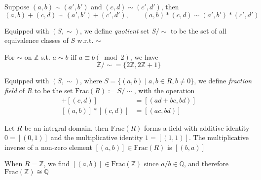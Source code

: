 \begin{proposition}
Suppose $(a,b)\sim(a',b')$ and $(c,d)\sim(c',d')$, then
\[
(a,b)+(c,d)\sim(a',b')+(c',d'),\qquad
(a,b)*(c,d)\sim(a',b')*(c',d')
\]
\end{proposition}
\begin{definition}
Equipped with $(S,\sim)$, we define \emph{quotient} set $S/\sim$ to be the set of all equivalence classes of $S$ w.r.t. $\sim$
\end{definition}


\begin{example}
For $\sim$ on $\mathbb{Z}$ s.t. $a\sim b$ iff $a\equiv b(\bmod 2)$, we have
\[
\mathbb{Z}/\sim  = \{2\mathbb{Z},2\mathbb{Z}+1\}
\]
\end{example}
\begin{definition}
Equipped with $(S,\sim)$, where $S=\{(a,b)\mid a,b\in R,b\ne0\}$, we define \emph{fraction field} of $R$ to be the set $\mbox{Frac}(R):=S/\sim$, with the operation
\begin{align*}
[(a,b)]+[(c,d)]&=[(ad+bc,bd)]\\
[(a,b)]*[(c,d)]&=[(ac,bd)]
\end{align*}
\end{definition}


\begin{proposition}
Let $R$ be an integral domain, then $\mbox{Frac}(R)$ forms a field with additive identity $0=[(0,1)]$ and the multiplicative identity $1=[(1,1)]$. The multiplicative inverse of a non-zero element $[(a,b)]\in\mbox{Frac}(R)$ is $[(b,a)]$
\end{proposition}
\begin{remark}
When $R=\mathbb{Z}$, we find $[(a,b)]\in\mbox{Frac}(\mathbb{Z})$ since $a/b\in\mathbb{Q}$, and therefore $\mbox{Frac}(\mathbb{Z})\cong\mathbb{Q}$
\end{remark}




















